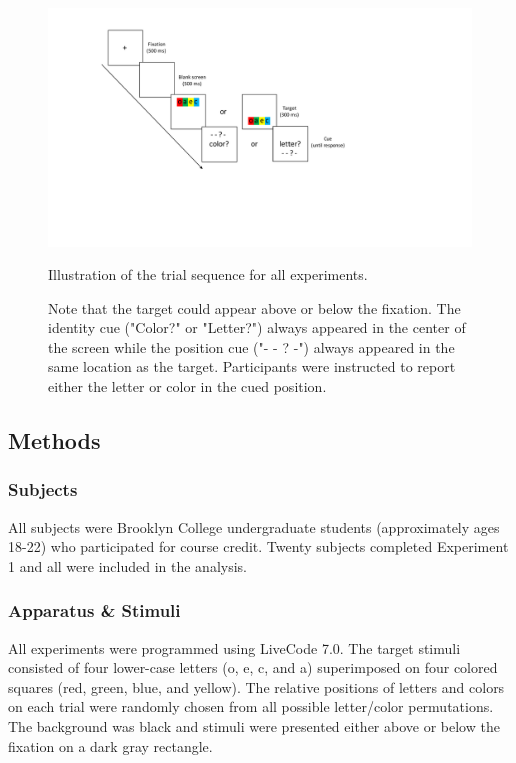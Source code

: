 \documentclass[]{DissertateCUNY}
\begin{document}
\begin{figure}
  \centering
  \includegraphics[width=5in]{figures/ICfigure1.pdf}
  \caption{Illustration of the trial sequence for all experiments.}
  \caption*{Note that the target could appear above or below the fixation. The identity cue ("Color?" or "Letter?") always appeared in the center of the screen while the position cue ("- - ? -") always appeared in the same location as the target. Participants were instructed to report either the letter or color in the cued position.}

  \label{IC_figure1}
\end{figure}

\hypertarget{methods}{%
\subsection{Methods}\label{methods}}

\hypertarget{subjects}{%
\subsubsection{Subjects}\label{subjects}}

All subjects were Brooklyn College undergraduate students (approximately
ages 18-22) who participated for course credit. Twenty subjects
completed Experiment 1 and all were included in the analysis.

\hypertarget{apparatus-stimuli}{%
\subsubsection{Apparatus \& Stimuli}\label{apparatus-stimuli}}

All experiments were programmed using LiveCode 7.0. The target stimuli
consisted of four lower-case letters (o, e, c, and a) superimposed on
four colored squares (red, green, blue, and yellow). The relative
positions of letters and colors on each trial were randomly chosen from
all possible letter/color permutations. The background was black and
stimuli were presented either above or below the fixation on a dark gray
rectangle.
\end{document}
